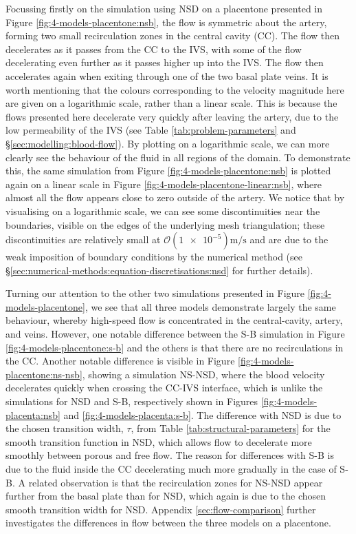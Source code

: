             Focussing firstly on the simulation using NSD on a placentone presented in Figure \ref{fig:4-models-placentone:nsb}, the flow is symmetric about the artery, forming two small recirculation zones in the central cavity (CC). The flow then decelerates as it passes from the CC to the IVS, with some of the flow decelerating even further as it passes higher up into the IVS. The flow then accelerates again when exiting through one of the two basal plate veins. It is worth mentioning that the colours corresponding to the velocity magnitude here are given on a logarithmic scale, rather than a linear scale. This is because the flows presented here decelerate very quickly after leaving the artery, due to the low permeability of the IVS (see Table \ref{tab:problem-parameters} and \S\ref{sec:modelling:blood-flow}). By plotting on a logarithmic scale, we can more clearly see the behaviour of the fluid in all regions of the domain. To demonstrate this, the same simulation from Figure \ref{fig:4-models-placentone:nsb} is plotted again on a linear scale in Figure \ref{fig:4-models-placentone-linear:nsb}, where almost all the flow appears close to zero outside of the artery. We notice that by visualising on a logarithmic scale, we can see some discontinuities near the boundaries, visible on the edges of the underlying mesh triangulation; these discontinuities are relatively small at $\mathcal{O}(\num{1e-5})\unit{\metre\per\second}$ and are due to the weak imposition of boundary conditions by the numerical method (see \S\ref{sec:numerical-methods:equation-discretisations:nsd} for further details).
    
            Turning our attention to the other two simulations presented in Figure \ref{fig:4-models-placentone}, we see that all three models demonstrate largely the same behaviour, whereby high-speed flow is concentrated in the central-cavity, artery, and veins. However, one notable difference between the S-B simulation in Figure \ref{fig:4-models-placentone:s-b} and the others is that there are no recirculations in the CC. Another notable difference is visible in Figure \ref{fig:4-models-placentone:ns-nsb}, showing a simulation NS-NSD, where the blood velocity decelerates quickly when crossing the CC-IVS interface, which is unlike the simulations for NSD and S-B, respectively shown in Figures \ref{fig:4-models-placenta:nsb} and \ref{fig:4-models-placenta:s-b}. The difference with NSD is due to the chosen transition width, $\tau$, from Table \ref{tab:structural-parameters} for the smooth transition function in NSD, which allows flow to decelerate more smoothly between porous and free flow. The reason for differences with S-B is due to the fluid inside the CC decelerating much more gradually in the case of S-B. A related observation is that the recirculation zones for NS-NSD appear further from the basal plate than for NSD, which again is due to the chosen smooth transition width for NSD. Appendix \ref{sec:flow-comparison} further investigates the differences in flow between the three models on a placentone.
            
